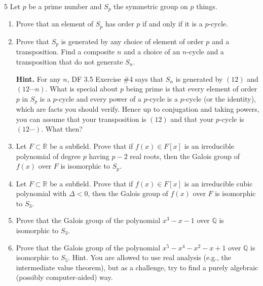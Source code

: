 \documentclass[12pt]{article}
\begin{document}
\newpage 

\begin{problem}{5}
    Let $p$ be a prime number and $S_p$ the symmetric group on $p$ things.

    \begin{enumerate}
        \item[(a)] Prove that an element of $S_p$ has order $p$ if and only if it is a $p$-cycle.

        \item[(b)] Prove that $S_p$ is generated by any choice of element of order $p$ and a transposition. Find a composite $n$ and a choice of an $n$-cycle and a transposition that do not generate $S_n$. 
        
        \textbf{Hint.} For any $n$, DF 3.5 Exercise \#4 says that $S_n$ is generated by $(12)$ and $(12 \cdots n)$. What is special about $p$ being prime is that every element of order $p$ in $S_p$ is a $p$-cycle and every power of a $p$-cycle is a $p$-cycle (or the identity), which are facts you should verify. Hence up to conjugation and taking powers, you can assume that your transposition is $(12)$ and that your $p$-cycle is $(12 \cdots)$. What then?

        \item[(c)] Let $F \subset \mathbb{R}$ be a subfield. Prove that if $f(x) \in F[x]$ is an irreducible polynomial of degree $p$ having $p - 2$ real roots, then the Galois group of $f(x)$ over $F$ is isomorphic to $S_p$.

        \item[(d)] Let $F \subset \mathbb{R}$ be a subfield. Prove that if $f(x) \in F[x]$ is an irreducible cubic polynomial with $\Delta < 0$, then the Galois group of $f(x)$ over $F$ is isomorphic to $S_3$.

        \item[(e)] Prove that the Galois group of the polynomial $x^3 - x - 1$ over $\mathbb{Q}$ is isomorphic to $S_3$.

        \item[(f)] Prove that the Galois group of the polynomial $x^5 - x^4 - x^2 - x + 1$ over $\mathbb{Q}$ is isomorphic to $S_5$. Hint. You are allowed to use real analysis (e.g., the intermediate value theorem), but as a challenge, try to find a purely algebraic (possibly computer-aided) way.
        \end{enumerate}
\end{problem}
\end{document}
